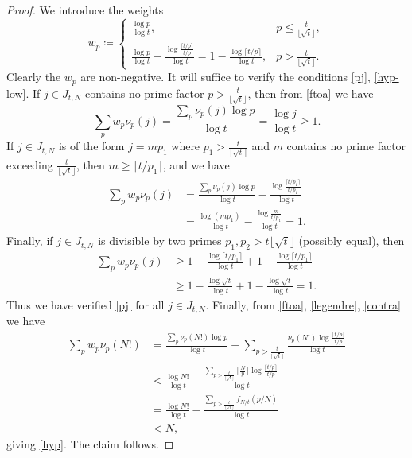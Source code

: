 \documentclass[10pt,a4paper,reqno]{amsart}
\numberwithin{equation}{section}
\theoremstyle{plain}
\theoremstyle{definition}
\begin{document}
\begin{proof} We introduce the weights
  $$
w_p \coloneqq  \begin{cases}
  \frac{\log p}{\log t}, & p  \leq \frac{t}{\lfloor \sqrt{t} \rfloor}, \\
  \frac{\log p}{\log t} - \frac{\log \frac{\lceil t/p \rceil}{t/p}}{\log t} = 1 - \frac{\log \lceil t/p \rceil}{\log t}, & p  > \frac{t}{\lfloor \sqrt{t} \rfloor}.
\end{cases}
$$
Clearly the $w_p$ are non-negative.  It will suffice to verify the conditions \eqref{pj}, \eqref{hyp-low}.  If $j \in J_{t,N}$ contains no prime factor $p > \frac{t}{\lfloor \sqrt{t} \rfloor}$, then from \eqref{ftoa} we have
$$ \sum_p w_p \nu_p(j) = \frac{\sum_p \nu_p(j) \log p}{\log t} = \frac{\log j}{\log t} \geq 1.$$
If $j \in J_{t,N}$ is of the form $j = mp_1$ where $p_1 > \frac{t}{\lfloor \sqrt{t} \rfloor}$ and $m$ contains no prime factor exceeding $\frac{t}{\lfloor \sqrt{t} \rfloor}$, then $m \geq \lceil t/p_1 \rceil$, and we have
\begin{align*}
\sum_p w_p \nu_p(j) &= \frac{\sum_p \nu_p(j) \log p}{\log t}
- \frac{\log \frac{\lceil t/p_1 \rceil}{t/p_1}}{\log t}\\
&= \frac{\log(mp_1)}{\log t} -  \frac{\log \frac{m}{t/p_1}}{\log t} = 1.
\end{align*}
Finally, if $j \in J_{t,N}$ is divisible by two primes $p_1, p_2 > {t}{\lfloor \sqrt{t} \rfloor}$ (possibly equal), then
\begin{align*}
  \sum_p w_p \nu_p(j) &\geq
  1 - \frac{\log \lceil t/p_1 \rceil}{\log t} + 1 - \frac{\log \lceil t/p_1 \rceil}{\log t} \\
  &\geq
  1 - \frac{\log \sqrt{t}}{\log t} + 1 - \frac{\log \sqrt{t}}{\log t} = 1.
\end{align*}
Thus we have verified \eqref{pj} for all $j \in J_{t,N}$.  Finally, from \eqref{ftoa}, \eqref{legendre}, \eqref{contra} we have
\begin{align*}
  \sum_p w_p \nu_p(N!) &= \frac{\sum_p \nu_p(N!) \log p}{\log t} - \sum_{p > \frac{t}{\lfloor \sqrt{t} \rfloor}} \frac{\nu_p(N!) \log \frac{\lceil t/p \rceil}{t/p}}{\log t} \\
  &\leq \frac{\log N!}{\log t} -  \frac{\sum_{p > \frac{t}{\lfloor \sqrt{t} \rfloor}} \lfloor \frac{N}{p} \rfloor \log \frac{\lceil t/p \rceil}{t/p}}{\log t}\\
  &= \frac{\log N!}{\log t} - \frac{\sum_{p > \frac{t}{\lfloor \sqrt{t} \rfloor}} f_{N/t}(p/N)}{\log t} \\
  &< N,
\end{align*}
giving \eqref{hyp}.  The claim follows.
\end{proof}
\end{document}
